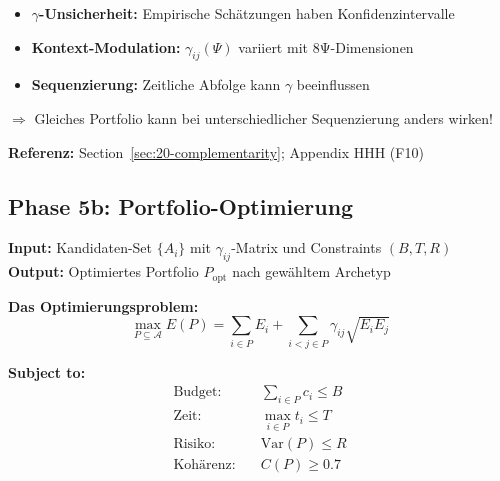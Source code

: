 \begin{tcolorbox}[colback=orange!5!white, colframe=orange!75!black,
    title=\textbf{Variabilität in Phase 5}]
\begin{itemize}[nosep]
\item \textbf{$\gamma$-Unsicherheit:} Empirische Schätzungen haben Konfidenzintervalle
\item \textbf{Kontext-Modulation:} $\gamma_{ij}(\Psi)$ variiert mit 8Ψ-Dimensionen
\item \textbf{Sequenzierung:} Zeitliche Abfolge kann $\gamma$ beeinflussen
\end{itemize}
$\Rightarrow$ Gleiches Portfolio kann bei unterschiedlicher Sequenzierung anders wirken!
\end{tcolorbox}

\textbf{Referenz:} Section~\ref{sec:20-complementarity}; Appendix HHH (F10)

\subsection{Phase 5b: Portfolio-Optimierung}
\label{sec:20-phase5b}

\textbf{Input:} Kandidaten-Set $\{A_i\}$ mit $\gamma_{ij}$-Matrix und Constraints $(B, T, R)$\\
\textbf{Output:} Optimiertes Portfolio $P_{\text{opt}}$ nach gewähltem Archetyp

\textbf{Das Optimierungsproblem:}
\begin{equation}
\boxed{
\max_{P \subseteq \mathcal{A}} E(P) = \sum_{i \in P} E_i + \sum_{i < j \in P} \gamma_{ij} \sqrt{E_i E_j}
}
\end{equation}

\textbf{Subject to:}
\begin{align}
\text{Budget:} \quad & \sum_{i \in P} c_i \leq B \\
\text{Zeit:} \quad & \max_{i \in P} t_i \leq T \\
\text{Risiko:} \quad & \text{Var}(P) \leq R \\
\text{Kohärenz:} \quad & C(P) \geq 0.7
\end{align}

